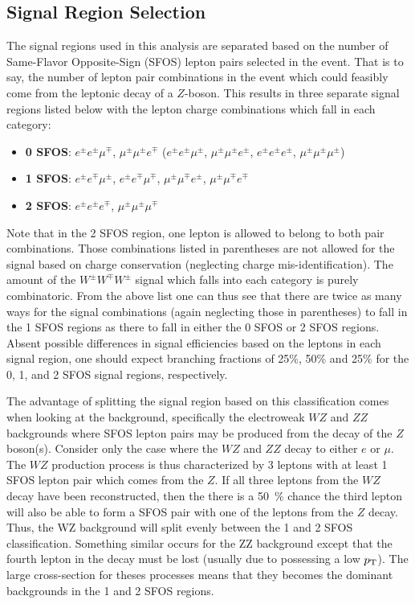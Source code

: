 \subsection{Signal Region Selection}
\label{sec:signal_regions}
The signal regions used in this analysis are separated based on the number of 
Same-Flavor Opposite-Sign (SFOS) lepton pairs selected in the event.  That is to say,
the number of lepton pair combinations in the event 
which could feasibly come from the leptonic decay of a $Z$-boson.
This results in three separate signal regions listed 
below with the lepton charge combinations
which fall in each category:
\begin{itemize}
\item \textbf{0 SFOS}: $e^{\pm}e^{\pm}\mu^{\mp}$, 
$\mu^{\pm}\mu^{\pm}e^{\mp}$ ($e^{\pm}e^{\pm}\mu^{\pm}$, 
$\mu^{\pm}\mu^{\pm}e^{\pm}$, $e^{\pm}e^{\pm}e^{\pm}$, $\mu^{\pm}\mu^{\pm}\mu^{\pm}$)
\item \textbf{1 SFOS}: $e^{\pm}e^{\mp}\mu^{\pm}$, 
$e^{\pm}e^{\mp}\mu^{\mp}$, $\mu^{\pm}\mu^{\mp}e^{\pm}$, $\mu^{\pm}\mu^{\mp}e^{\mp}$
\item \textbf{2 SFOS}: $e^{\pm}e^{\pm}e^{\mp}$, $\mu^{\pm}\mu^{\pm}\mu^{\mp}$
\end{itemize}
Note that in the 2 SFOS region, one lepton is allowed to belong to both 
pair combinations.
Those combinations listed in parentheses are not allowed for the signal based on charge conservation (neglecting charge mis-identification).  
The amount of the $W^{\pm}W^{\mp}W^{\pm}$ signal
which falls into each category is purely combinatoric.  
From the above list one can thus see that there are twice as many ways 
for the signal combinations (again neglecting those in parentheses)
to fall in the 1 SFOS regions as there to fall in either the 0 SFOS or 2 SFOS regions. 
Absent possible differences in signal efficiencies based on the leptons in each 
signal region, one should expect branching 
fractions of 25\%, 50\% and 25\% for the 0, 1, and 2 SFOS signal regions, respectively.

The advantage of splitting the signal region based on this
classification comes when looking at the background, specifically the
electroweak $WZ$ and $ZZ$ backgrounds where SFOS lepton pairs may be
produced from the decay of the $Z$ boson(s). Consider only the case
where the $WZ$ and $ZZ$ decay to either $e$ or $\mu$.  The $WZ$ production
process is thus characterized by 3 leptons with at least 1 SFOS lepton pair
which comes from the $Z$. If all three leptons from the $WZ$ decay have been
reconstructed, then the there is a 50~\% chance the third lepton 
will also be able to form a SFOS pair with one of the leptons from the $Z$ decay.
Thus, the WZ background will split evenly between the 1 and 2 SFOS classification.
Something similar occurs for the ZZ background except that the fourth lepton 
in the decay must be lost (usually due to possessing a low $p_{\mathrm{T}}$).
The large cross-section for theses processes means that
they becomes the dominant backgrounds in the 1 and 2 SFOS regions.  

